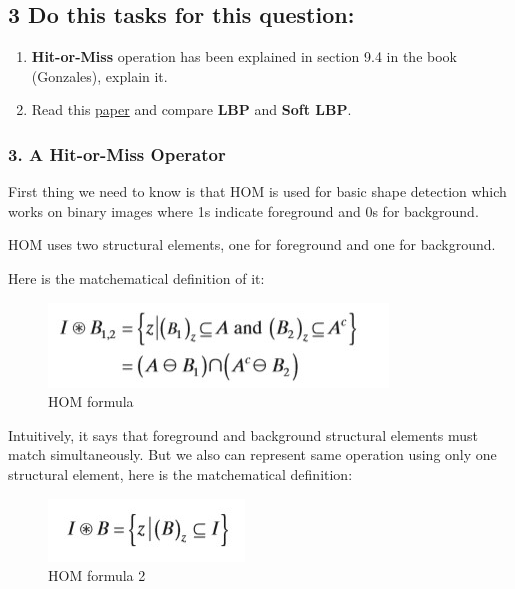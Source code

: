 \documentclass[11pt]{article}
\makeatletter
\def\maxwidth{\ifdim\Gin@nat@width>\linewidth\linewidth
    \else\Gin@nat@width\fi}
\let\Oldincludegraphics\includegraphics
\renewcommand{\includegraphics}[1]{\Oldincludegraphics[width=.8\maxwidth]{#1}}
\providecommand{\tightlist}{%
      \setlength{\itemsep}{0pt}\setlength{\parskip}{0pt}}
\makeatother
\begin{document}
    \hypertarget{do-this-tasks-for-this-question}{%
\subsection{3 Do this tasks for this
question:}\label{do-this-tasks-for-this-question}}

\begin{enumerate}
\def\labelenumi{\arabic{enumi}.}
\tightlist
\item
  \textbf{Hit-or-Miss} operation has been explained in section 9.4 in
  the book (Gonzales), explain it.
\item
  Read this
  \href{http://www.ee.oulu.fi/research/mvmp/mvg/files/pdf/ahonen_soft_histograms_for_local_binary_patterns.pdf}{paper}
  and compare \textbf{LBP} and \textbf{Soft LBP}.
\end{enumerate}

    \hypertarget{a-hit-or-miss-operator}{%
\subsubsection{\texorpdfstring{3. A \textbf{Hit-or-Miss}
Operator}{3. A Hit-or-Miss Operator}}\label{a-hit-or-miss-operator}}

First thing we need to know is that HOM is used for basic shape
detection which works on binary images where 1s indicate foreground and
0s for background.

HOM uses two structural elements, one for foreground and one for
background.

Here is the matchematical definition of it:

\begin{figure}
\centering
\includegraphics{wiki/3_1_1.jpg}
\caption{HOM formula}
\end{figure}

Intuitively, it says that foreground and background structural elements
must match simultaneously. But we also can represent same operation
using only one structural element, here is the matchematical definition:

\begin{figure}
\centering
\includegraphics{wiki/3_1_2.jpg}
\caption{HOM formula 2}
\end{figure}
\end{document}
